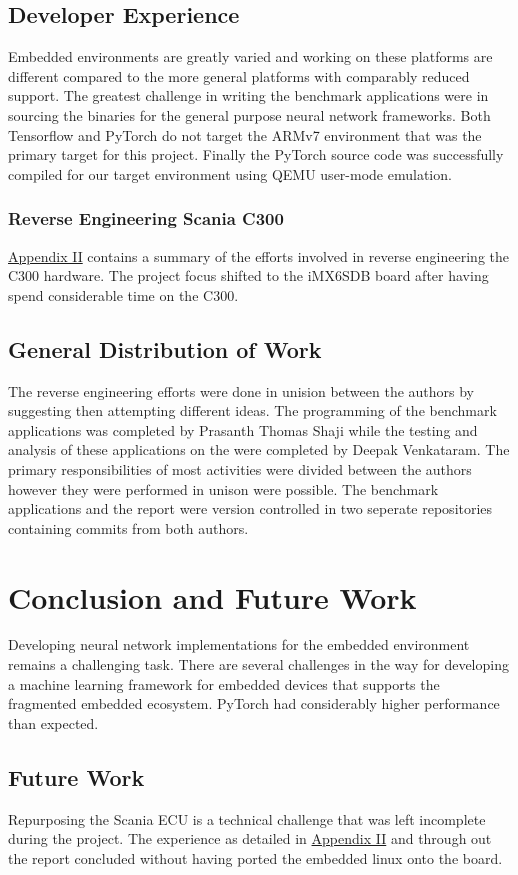 \section{Developer Experience}

Embedded environments are greatly varied and working on these platforms are different compared to the more general platforms with comparably reduced support. The greatest challenge in writing the benchmark applications were in sourcing the binaries for the general purpose neural network frameworks. Both Tensorflow and PyTorch do not target the ARMv7 environment that was the primary target for this project. Finally the PyTorch source code was successfully compiled for our target environment using QEMU user-mode emulation.

\subsection{Reverse Engineering Scania C300}

\hyperref[rtc-c300]{Appendix II} contains a summary of the efforts involved in reverse engineering the C300 hardware. The project focus shifted to the iMX6SDB board after having spend considerable time on the C300.

\section{General Distribution of Work}

The reverse engineering efforts were done in unision between the authors by suggesting then attempting different ideas. The programming of the benchmark applications was completed by Prasanth Thomas Shaji while the testing and analysis of these applications on the were completed by Deepak Venkataram. The primary responsibilities of most activities were divided between the authors however they were performed in unison were possible. The benchmark applications and the report were version controlled in two seperate repositories containing commits from both authors.

\chapter{Conclusion and Future Work}

Developing neural network implementations for the embedded environment remains a challenging task. There are several challenges in the way for developing a machine learning framework for embedded devices that supports the fragmented embedded ecosystem. PyTorch had considerably higher performance than expected.


\section{Future Work}

Repurposing the Scania ECU is a technical challenge that was left incomplete during the project. The experience as detailed in \hyperref[rtc-c300]{Appendix II} and through out the report concluded without having ported the embedded linux onto the board.
